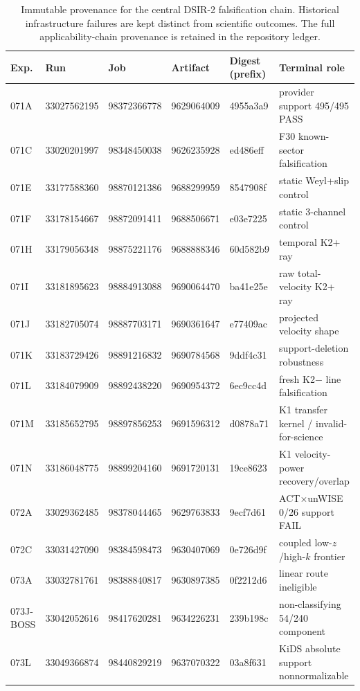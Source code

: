 \begin{table}[t]
\centering
\caption{Immutable provenance for the central DSIR-2 falsification chain. Historical infrastructure failures are kept distinct from scientific outcomes. The full applicability-chain provenance is retained in the repository ledger.}
\label{tab:provenance}
\scriptsize
\begin{tabular}{llllll}
\toprule
Exp. & Run & Job & Artifact & Digest (prefix) & Terminal role \\
\midrule
071A & 33027562195 & 98372366778 & 9629064009 & 4955a3a9 & provider support 495/495 PASS \\
071C & 33020201997 & 98348450038 & 9626235928 & ed486eff & F30 known-sector falsification \\
071E & 33177588360 & 98870121386 & 9688299959 & 8547908f & static Weyl+slip control \\
071F & 33178154667 & 98872091411 & 9688506671 & e03e7225 & static 3-channel control \\
071H & 33179056348 & 98875221176 & 9688888346 & 60d582b9 & temporal K2+ ray \\
071I & 33181895623 & 98884913088 & 9690064470 & ba41e25e & raw total-velocity K2+ ray \\
071J & 33182705074 & 98887703171 & 9690361647 & e77409ac & projected velocity shape \\
071K & 33183729426 & 98891216832 & 9690784568 & 9ddf4c31 & support-deletion robustness \\
071L & 33184079909 & 98892438220 & 9690954372 & 6ec9cc4d & fresh K2$-$ line falsification \\
071M & 33185652795 & 98897856253 & 9691596312 & d0878a71 & K1 transfer kernel / invalid-for-science \\
071N & 33186048775 & 98899204160 & 9691720131 & 19ce8623 & K1 velocity-power recovery/overlap \\
\midrule
072A & 33029362485 & 98378044465 & 9629763833 & 9ecf7d61 & ACT$\times$unWISE 0/26 support FAIL \\
072C & 33031427090 & 98384598473 & 9630407069 & 0e726d9f & coupled low-$z$/high-$k$ frontier \\
073A & 33032781761 & 98388840817 & 9630897385 & 0f2212d6 & linear route ineligible \\
073J-BOSS & 33042052616 & 98417620281 & 9634226231 & 239b198c & non-classifying 54/240 component \\
073L & 33049366874 & 98440829219 & 9637070322 & 03a8f631 & KiDS absolute support nonnormalizable \\
\bottomrule
\end{tabular}
\end{table}
